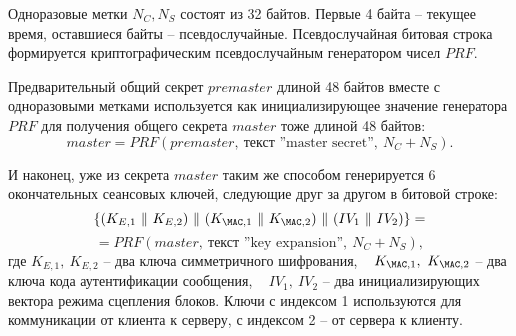 





Одноразовые метки $N_C, N_S$ состоят из 32 байтов. Первые 4 байта -- текущее время, оставшиеся байты -- псевдослучайные. Псевдослучайная битовая строка формируется криптографическим псевдослучайным генератором чисел $PRF$.

Предварительный общий секрет $premaster$ длиной 48 байтов вместе с одноразовыми метками используется как инициализирующее значение генератора $PRF$ для получения общего секрета $master$ тоже длиной 48 байтов:
    \[ master = PRF(premaster, ~\text{текст ''master secret''}, ~ N_C + N_S) .\]

И наконец, уже из секрета $master$ таким же способом генерируется 6 окончательных сеансовых ключей, следующие друг за другом в битовой строке:
    \[ \{ (K_{E,1} ~\|~ K_{E,2}) ~\|~ (K_{\MAC,1} ~\|~ K_{\MAC,2}) ~\|~ (IV_1 ~\|~ IV_2) \} = \]
        \[ = PRF(master, ~\text{текст ''key expansion''}, ~ N_C + N_S), \]
где $K_{E,1}, ~ K_{E,2}$ -- два ключа симметричного шифрования, ~ $K_{\MAC,1}, ~ K_{\MAC,2}$ -- два ключа кода аутентификации сообщения, ~ $IV_1, ~IV_2$ -- два инициализирующих вектора режима сцепления блоков. Ключи с индексом 1 используются для коммуникации от клиента к серверу, с индексом 2 -- от сервера к клиенту.


